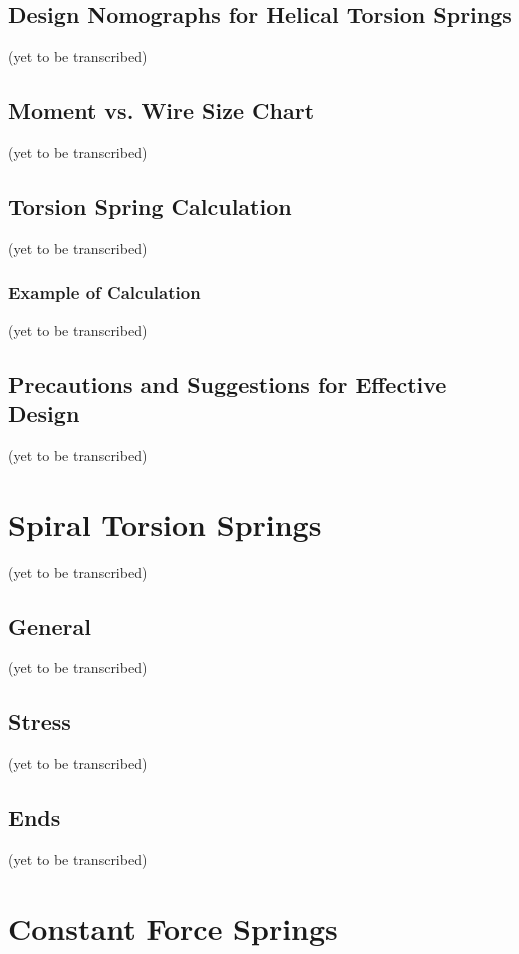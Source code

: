 \documentclass[10pt]{article}
\begin{document}
\subsection{Design Nomographs for Helical Torsion Springs} %
(yet to be transcribed)

\subsection{Moment vs. Wire Size Chart} %
(yet to be transcribed)

\subsection{Torsion Spring Calculation} %
(yet to be transcribed)

\subsubsection{Example of Calculation} %
(yet to be transcribed)

\subsection{Precautions and Suggestions for Effective Design} %
(yet to be transcribed)

\section{Spiral Torsion Springs} %
(yet to be transcribed)

\subsection{General}
(yet to be transcribed)

\subsection{Stress}
(yet to be transcribed)

\subsection{Ends}
(yet to be transcribed)

\section{Constant Force Springs}
\end{document}
